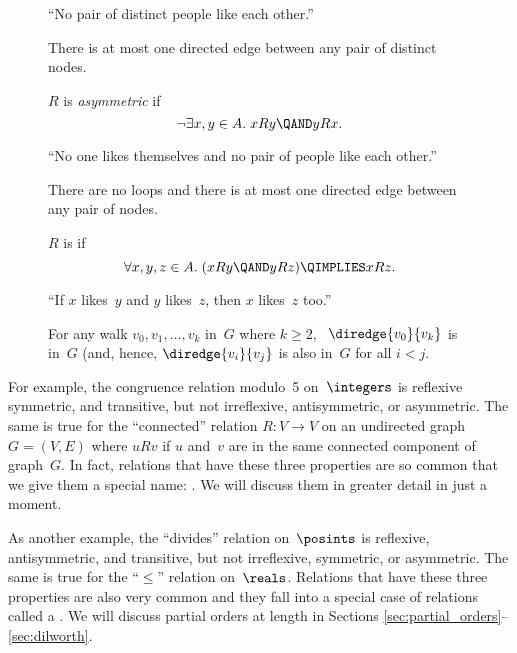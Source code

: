 \begin{figure}[p]
{\begin{description}
``No pair of distinct people like each other.''

There is at most one directed edge between any pair of distinct nodes.

\item[Asymmetry]

$R$ is \emph{asymmetric} if
\begin{equation*}
    \neg \exists x, y \in A. \; x R y \QAND y R x.
\end{equation*}

``No one likes themselves and no pair of people like each other.''

There are no loops and there is at most one directed edge between any
pair of nodes.

\item[Transitivity]

$R$ is  if
\begin{equation*}
    \forall x, y, z \in A. \; (x R y \QAND y R z) \QIMPLIES x R z.
\end{equation*}

``If $x$ likes~$y$ and $y$ likes~$z$, then $x$ likes~$z$ too.''

For any walk $v_0, v_1, \dots, v_k$ in~$G$ where $k \ge 2$,
\ $\diredge{v_0}{v_k}$ is in~$G$ (and, hence, $\diredge{v_i}{v_j}$ is
also in~$G$ for all $i < j$.

\end{description}}

\end{figure}

For example, the congruence relation modulo~5 on~$\integers$ is
reflexive symmetric, and transitive, but not irreflexive,
antisymmetric, or asymmetric.  The same is true for the ``connected''
relation $R: V \to V$ on an undirected graph $G = (V, E)$ where $u R
v$ if $u$ and~$v$ are in the same connected component of graph~$G$.
In fact, relations that have these three properties are so common that
we give them a special name: .  We will
discuss them in greater detail in just a moment.

As another example, the ``divides'' relation on~$\posints$ is
reflexive, antisymmetric, and transitive, but not irreflexive,
symmetric, or asymmetric.  The same is true for the ``$\le$'' relation
on~$\reals$.  Relations that have these three properties are also very
common and they fall into a special case of relations called a
.  We will discuss partial orders at length in
Sections \ref{sec:partial_orders}--\ref{sec:dilworth}.

